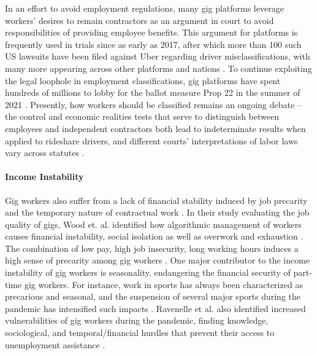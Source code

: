 In an effort to avoid employment regulations, many gig platforms leverage workers' desires to remain contractors as an argument in court to avoid responsibilities of providing employee benefits. This argument for platforms is frequently used in trials since as early as 2017, after which more than 100 such US lawsuits have been filed against Uber regarding driver misclassifications, with many more appearing across other platforms and nations \cite{employment, category}. To continue exploiting the legal loophole in employment classifications, gig platforms have spent hundreds of millions to lobby for the ballot measure Prop 22 in the summer of 2021 \cite{conger2021judge}. Presently, how workers should be classified remains an ongoing debate -- the control and economic realities tests that serve to distinguish between employees and independent contractors both lead to indeterminate results when applied to rideshare drivers, and different courts'  interpretations of labor laws vary across statutes \cite{category, harris2015proposal}.

\paragraph{Income Instability}
Gig workers also suffer from a lack of financial stability induced by job precarity and the temporary nature of contractual work \cite{anwar2020precarity}. In their study evaluating the job quality of gigs, Wood et. al. identified {how} algorithmic management of workers cause{s} financial instability, social isolation as well as overwork and exhaustion \cite{good}. The combination of low pay, high job insecurity, long working hours induces a high sense of precarity among gig workers \cite{Dubal2017-bj,Hua2018-qx,precarity,Webster2016-gi,Vosko2006-ec}. One major contributor to the income instability of gig workers is seasonality, endangering the financial security of part-time gig workers. For instance, work in sports has always been characterized as precarious and seasonal, and the suspension of several major sports during the pandemic has intensified such impacts \cite{javits2022gig, sheptak2020sport}. Ravenelle et al. also identified increased vulnerabilities of gig workers during the pandemic, finding knowledge, sociological, and temporal/financial hurdles that prevent their access to unemployment assistance \cite{ravenelle2021side}.


